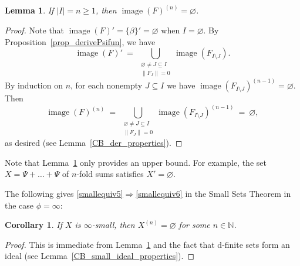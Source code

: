 \documentclass[11pt]{amsart}
\theoremstyle{plain}
\newtheorem{lemma}[thm]{Lemma}
\newtheorem{cor}[thm]{Corollary}
\theoremstyle{definition}
\numberwithin{equation}{section}
\newcommand\N{\mathbb{N}}
\newcommand\0{\varnothing}
\DeclareMathOperator\image{image}
\begin{document}
\begin{lemma}\label{lem_primdsetCBrank}
If $|I|=n \geq 1$, then $\image(F)^{(n)}=\0$.
\end{lemma}
\begin{proof}
Note that $\image(F)'=\{\beta\}'=\0$ when $I=\0$.
By Proposition~\ref{prop_derivePsifun}, we have
\[
\image(F)' \ = \ \bigcup_{\substack{\0\neq J\subseteq I \\ \|F_J\|=0}} \image(F_{I\setminus J}).
\]
By induction on $n$, for each nonempty $J\subseteq I$ we have $\image(F_{I\setminus J})^{(n-1)}=\0$. Then
\[
\image(F)^{(n)} \ = \ \bigcup_{\substack{\0\neq J\subseteq I \\ \|F_J\|=0}} \image(F_{I\setminus J})^{(n-1)} \ = \ \0,
\]
as desired (see Lemma~\ref{CB_der_properties}).
\end{proof}

\noindent
Note that Lemma~\ref{lem_primdsetCBrank} only provides an upper bound.
For example, the set $X=\Psi+\dots+\Psi$ of $n$-fold sums satisfies $X'=\0$.

\medskip\noindent
The following gives  \eqref{smallequiv5}$\Rightarrow$\eqref{smallequiv6} in the Small Sets Theorem in the case $\phi=\infty$:

\begin{cor}\label{cor_dsetCBrankemptyint}
If $X$ is $\infty$-small, then $X^{(n)}=\0$ for some $n \in \N$.
\end{cor}
\begin{proof}
This is immediate from Lemma~\ref{lem_primdsetCBrank} and the fact that d-finite sets form an ideal (see Lemma~\ref{CB_small_ideal_properties}).
\end{proof}
\end{document}
